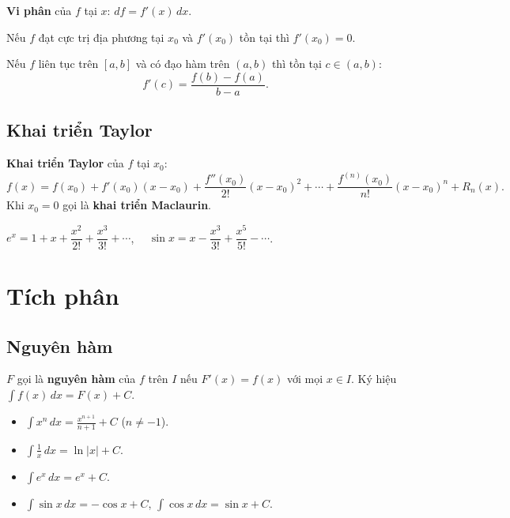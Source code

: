 \documentclass[12pt,a4paper]{article}
\begin{document}
\begin{dinhnghia}
  \textbf{Vi phân} của $f$ tại $x$: $df = f'(x)\, dx$.
\end{dinhnghia}

\begin{dinhly}[title={Định lý Fermat}]
  Nếu $f$ đạt cực trị địa phương tại $x_0$ và $f'(x_0)$ tồn tại thì $f'(x_0) = 0$.
\end{dinhly}

\begin{dinhly}[title={Định lý Lagrange}]
  Nếu $f$ liên tục trên $[a,b]$ và có đạo hàm trên $(a,b)$ thì tồn tại $c \in (a,b)$:
  \[
    f'(c) = \frac{f(b) - f(a)}{b - a}.
  \]
\end{dinhly}

\subsection{Khai triển Taylor}

\begin{congthuc}
  \textbf{Khai triển Taylor} của $f$ tại $x_0$:
  \[
    f(x) = f(x_0) + f'(x_0)(x - x_0) + \frac{f''(x_0)}{2!}(x - x_0)^2 + \cdots + \frac{f^{(n)}(x_0)}{n!}(x - x_0)^n + R_n(x).
  \]
  Khi $x_0 = 0$ gọi là \textbf{khai triển Maclaurin}.
\end{congthuc}

\begin{vidu}
  $e^x = 1 + x + \dfrac{x^2}{2!} + \dfrac{x^3}{3!} + \cdots$, $\quad \sin x = x - \dfrac{x^3}{3!} + \dfrac{x^5}{5!} - \cdots$.
\end{vidu}

\section{Tích phân}

\subsection{Nguyên hàm}

\begin{dinhnghia}
  $F$ gọi là \textbf{nguyên hàm} của $f$ trên $I$ nếu $F'(x) = f(x)$ với mọi $x \in I$. Ký hiệu $\displaystyle\int f(x)\,dx = F(x) + C$.
\end{dinhnghia}

\begin{congthuc}[title={Nguyên hàm cơ bản}]
  \begin{itemize}
    \item $\displaystyle\int x^n\,dx = \frac{x^{n+1}}{n+1} + C$ ($n \ne -1$).
    \item $\displaystyle\int \frac{1}{x}\,dx = \ln|x| + C$.
    \item $\displaystyle\int e^x\,dx = e^x + C$.
    \item $\displaystyle\int \sin x\,dx = -\cos x + C$, $\displaystyle\int \cos x\,dx = \sin x + C$.
  \end{itemize}
\end{congthuc}
\end{document}
